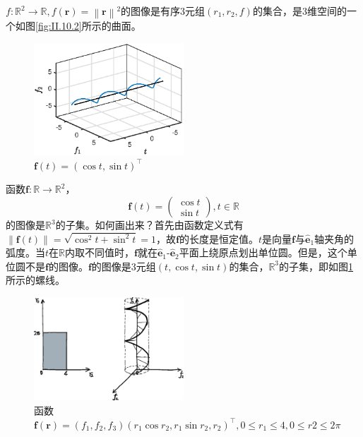 \documentclass[main.tex]{subfiles}
\begin{document}
\begin{example}\label{exp:II.10.3}
$f:\mathbb{R}^2\rightarrow\mathbb{R},f\left(\mathbf{r}\right)=\left\|\mathbf{r}\right\|^2$的图像是有序3元组$\left(r_1,r_2,f\right)$的集合，是3维空间的一个如图\ref{fig:II.10.2}所示的曲面。
\end{example}

\begin{figure}[h]
    \centering
    \includegraphics[width=0.5\textwidth]{images/II.10.3.eps}
    \caption{$\mathbf{f}\left(t\right)=\left(\cos t,\sin t\right)^\intercal$}
    \label{fig:II.10.3}
\end{figure}

\begin{example}\label{exp:II.10.4}
    函数$\mathbf{f}:\mathbb{R}\rightarrow\mathbb{R}^2$，
\[
\mathbf{f}\left(t\right)=\left(\begin{array}{c}\cos t\\\sin t\end{array}\right),t\in\mathbb{R}
\]
的图像是$\mathbb{R}^3$的子集。如何画出来？首先由函数定义式有$\left\|\mathbf{f}\left(t\right)\right\|=\sqrt{\cos^2t+\sin^2t}=1$，故$\mathbf{f}$的长度是恒定值。$t$是向量$\mathbf{f}$与$\mathbf{\hat{e}}_1$轴夹角的弧度。当$t$在$\mathbb{R}$内取不同值时，$\mathbf{f}$就在$\mathbf{\hat{e}}_1$-$\mathbf{\hat{e}}_2$平面上绕原点划出单位圆。但是，这个单位圆不是$\mathbf{f}$的图像。$\mathbf{f}$的图像是3元组$\left(t,\cos t,\sin t\right)$的集合，$\mathbb{R}^3$的子集，即如图\ref{fig:II.10.3}所示的螺线。
\end{example}

\begin{figure}[h]
    \centering
    \includegraphics[width=0.5\textwidth]{images/II.10.4.eps}
    \caption{函数$\mathbf{f}\left(\mathbf{r}\right)=\left(f_1,f_2,f_3\right)\left(r_1\cos r_2, r_1\sin r_2,r_2\right)^\intercal,0\leq r_1\leq 4,0\leq r2\leq 2\pi$}
    \label{fig:II.10.4}
\end{figure}
\end{document}
